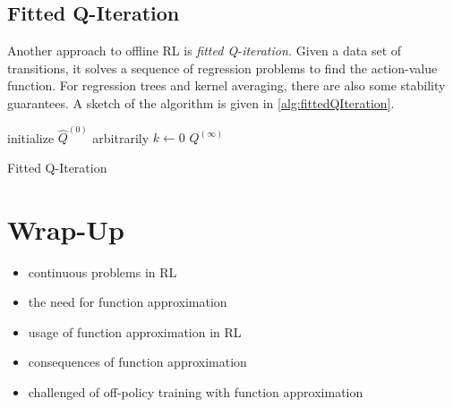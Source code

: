 		\subsection{Fitted Q-Iteration}
			Another approach to offline \ac{RL} is \emph{fitted Q-iteration.} Given a data set of transitions, it solves a sequence of regression problems to find the action-value function. For regression trees and kernel averaging, there are also some stability guarantees. A sketch of the algorithm is given in \autoref{alg:fittedQIteration}.

			\begin{algorithm}  \DontPrintSemicolon
				initialize \(\hat{Q}^{(0)}\) arbitrarily \;
				\( k \gets 0 \) \;
				\Return \(Q^{(\infty)}\) \;
				\caption{Fitted Q-Iteration}
				\label{alg:fittedQIteration}
			\end{algorithm}

	\section{Wrap-Up}
		\begin{itemize}
			\item continuous problems in \ac{RL}
			\item the need for function approximation
			\item usage of function approximation in \ac{RL}
			\item consequences of function approximation
			\item challenged of off-policy training with function approximation
		\end{itemize}

